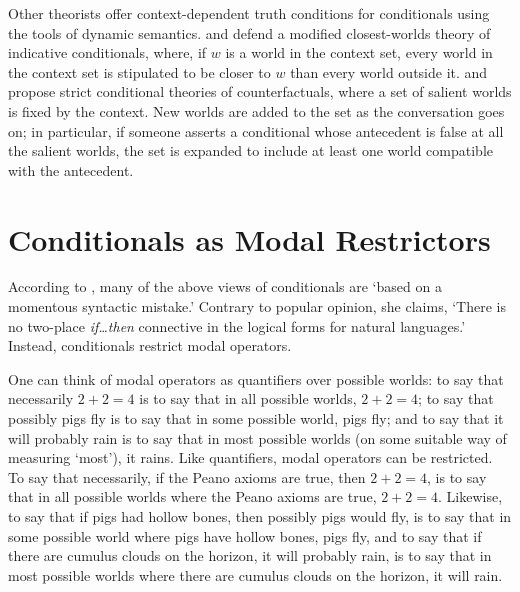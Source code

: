Other theorists offer context-dependent truth conditions for conditionals using the tools of dynamic semantics. \citet{stalnaker-indicative} and \citet{Williams2008-WILCAC-2} defend a modified closest-worlds theory of indicative conditionals, where, if $w$ is a world in the context set, every world in the context set is stipulated to be closer to $w$ than every world outside it. \citet{Gillies2007-GILCS} and \citet{fintel-dynamic} propose strict conditional theories of counterfactuals, where a set of salient worlds is fixed by the context.  New worlds are added to the set as the conversation goes on; in particular, if someone asserts a conditional whose antecedent is false at all the salient worlds, the set is expanded to include at least one world compatible with the antecedent.


\section{Conditionals as Modal Restrictors}

According to \citet[86]{kratzer-2012}, many of the above views of conditionals are `based on a momentous syntactic mistake.'  Contrary to popular opinion, she claims, `There is no two-place \emph{if\ldots then} connective in the logical forms for natural languages.'  Instead, conditionals restrict modal operators.

One can think of modal operators as quantifiers over possible worlds: to say that necessarily $2+2 = 4$ is to say that in all possible worlds, $2+2=4$; to say that possibly pigs fly is to say that in some possible world, pigs fly; and to say that it will probably rain is to say that in most possible worlds (on some suitable way of measuring `most'), it rains.  Like quantifiers, modal operators can be restricted.  To say that necessarily, if the Peano axioms are true, then $2+2=4$, is to say that in all possible worlds where the Peano axioms are true, $2+2=4$.  Likewise, to say that if pigs had hollow bones, then possibly pigs would fly, is to say that in some possible world where pigs have hollow bones, pigs fly, and to say that if there are cumulus clouds on the horizon, it will probably rain, is to say that in most possible worlds where there are cumulus clouds on the horizon, it will rain.

